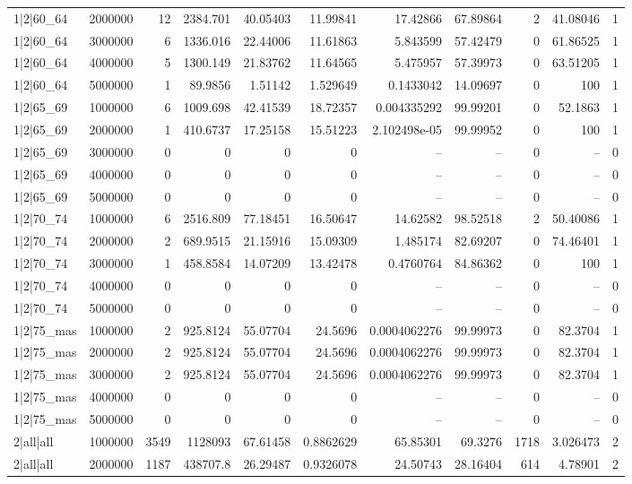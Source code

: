 \begin{tabular}{lrrrrrrrrrr}
1|2|60\_64 & 2000000 & 12 & 2384.701 & 40.05403 & 11.99841 & 17.42866 & 67.89864 & 2 & 41.08046 & 1 \\
1|2|60\_64 & 3000000 & 6 & 1336.016 & 22.44006 & 11.61863 & 5.843599 & 57.42479 & 0 & 61.86525 & 1 \\
1|2|60\_64 & 4000000 & 5 & 1300.149 & 21.83762 & 11.64565 & 5.475957 & 57.39973 & 0 & 63.51205 & 1 \\
1|2|60\_64 & 5000000 & 1 & 89.9856 & 1.51142 & 1.529649 & 0.1433042 & 14.09697 & 0 & 100 & 1 \\
1|2|65\_69 & 1000000 & 6 & 1009.698 & 42.41539 & 18.72357 & 0.004335292 & 99.99201 & 0 & 52.1863 & 1 \\
1|2|65\_69 & 2000000 & 1 & 410.6737 & 17.25158 & 15.51223 & 2.102498e-05 & 99.99952 & 0 & 100 & 1 \\
1|2|65\_69 & 3000000 & 0 & 0 & 0 & 0 & -- & -- & 0 & -- & 0 \\
1|2|65\_69 & 4000000 & 0 & 0 & 0 & 0 & -- & -- & 0 & -- & 0 \\
1|2|65\_69 & 5000000 & 0 & 0 & 0 & 0 & -- & -- & 0 & -- & 0 \\
1|2|70\_74 & 1000000 & 6 & 2516.809 & 77.18451 & 16.50647 & 14.62582 & 98.52518 & 2 & 50.40086 & 1 \\
1|2|70\_74 & 2000000 & 2 & 689.9515 & 21.15916 & 15.09309 & 1.485174 & 82.69207 & 0 & 74.46401 & 1 \\
1|2|70\_74 & 3000000 & 1 & 458.8584 & 14.07209 & 13.42478 & 0.4760764 & 84.86362 & 0 & 100 & 1 \\
1|2|70\_74 & 4000000 & 0 & 0 & 0 & 0 & -- & -- & 0 & -- & 0 \\
1|2|70\_74 & 5000000 & 0 & 0 & 0 & 0 & -- & -- & 0 & -- & 0 \\
1|2|75\_mas & 1000000 & 2 & 925.8124 & 55.07704 & 24.5696 & 0.0004062276 & 99.99973 & 0 & 82.3704 & 1 \\
1|2|75\_mas & 2000000 & 2 & 925.8124 & 55.07704 & 24.5696 & 0.0004062276 & 99.99973 & 0 & 82.3704 & 1 \\
1|2|75\_mas & 3000000 & 2 & 925.8124 & 55.07704 & 24.5696 & 0.0004062276 & 99.99973 & 0 & 82.3704 & 1 \\
1|2|75\_mas & 4000000 & 0 & 0 & 0 & 0 & -- & -- & 0 & -- & 0 \\
1|2|75\_mas & 5000000 & 0 & 0 & 0 & 0 & -- & -- & 0 & -- & 0 \\
2|all|all & 1000000 & 3549 & 1128093 & 67.61458 & 0.8862629 & 65.85301 & 69.3276 & 1718 & 3.026473 & 2 \\
2|all|all & 2000000 & 1187 & 438707.8 & 26.29487 & 0.9326078 & 24.50743 & 28.16404 & 614 & 4.78901 & 2 \\

\end{tabular}
